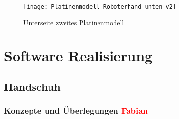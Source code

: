 \documentclass[titlepage,12pt,twoside]{article}
\begin{document}
\begin{figure}[H]
	\begin{center}
		\scalebox{0.8}
		{\texttt{[image: Platinenmodell\_Roboterhand\_unten\_v2]}}
		\caption{Unterseite zweites Platinenmodell}
		\label{fig:Platinenmodell_Roboterhand_unten_v2}		
	\end{center}
\end{figure}
\hfill \break



\section{Software Realisierung}

\subsection{Handschuh}
\subsubsection{Konzepte und Überlegungen \textcolor{red}{Fabian}}
\end{document}
